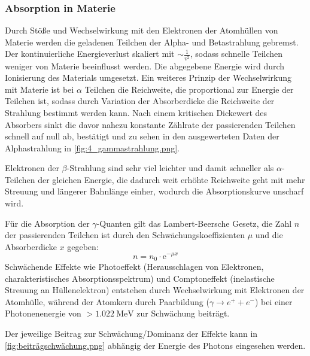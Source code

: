 \subsubsection{Absorption in Materie}
Durch Stöße und Wechselwirkung mit den Elektronen der Atomhüllen von Materie werden die geladenen Teilchen der Alpha- und Betastrahlung gebremst. Der kontinuierliche Energieverlust skaliert mit \(\sim\frac{1}{v^2}\), sodass schnelle Teilchen weniger von Materie beeinflusst werden. Die abgegebene Energie wird durch Ionisierung des Materials umgesetzt. Ein weiteres Prinzip der Wechselwirkung mit Materie ist bei \(\alpha\) Teilchen die Reichweite, die proportional zur Energie der Teilchen ist, sodass durch Variation der Absorberdicke die Reichweite der Strahlung bestimmt werden kann. Nach einem kritischen Dickewert des Absorbers sinkt die davor nahezu konstante Zählrate der passierenden Teilchen schnell auf null ab, bestätigt und zu sehen in den ausgewerteten Daten der Alphastrahlung in \cref{fig:4_gammastrahlung.png}. 

Elektronen der \(\beta\)-Strahlung sind sehr viel leichter und damit schneller als \(\alpha\)-Teilchen der gleichen Energie, die dadurch weit erhöhte Reichweite geht mit mehr Streuung und längerer Bahnlänge einher, wodurch die Absorptionskurve unscharf wird. 

Für die Absorption der \(\gamma\)-Quanten gilt das Lambert-Beersche Gesetz, die Zahl \(n\) der passierenden Teilchen ist durch den Schwächungskoeffizienten \(\mu\) und die Absorberdicke \(x\) gegeben: 
\begin{equation}\label{eq:lambertbeer}
    n=n_0\cdot\mathrm{e}^{-\mu x}
\end{equation}
Schwächende Effekte wie Photoeffekt (Herausschlagen von Elektronen, charakteristisches Absorptionsspektrum) und Comptoneffekt (inelastische Streuung an Hüllenelektron) entstehen durch Wechselwirkung mit Elektronen der Atomhülle, während der Atomkern durch Paarbildung (\(\gamma\rightarrow e^+ + e^-\)) bei einer Photonenenergie von \(>\qty{1.022}{\mega\electronvolt}\) zur Schwächung beiträgt. 

Der jeweilige Beitrag zur Schwächung/Dominanz der Effekte kann in \cref{fig:beiträgschwächung.png} abhängig der Energie des Photons eingesehen werden.
\FloatBarrier

